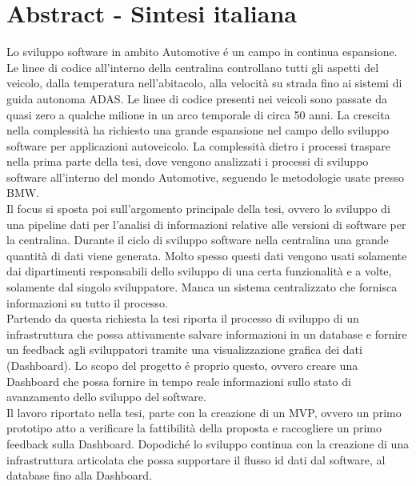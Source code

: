 \documentclass[../main.tex]{subfiles}
\begin{document}
\section{Abstract - Sintesi italiana}
Lo sviluppo software in ambito Automotive é un campo in continua espansione. Le linee di codice all'interno della centralina controllano tutti gli aspetti del veicolo, dalla temperatura nell'abitacolo, alla velocità su strada fino ai sistemi di guida autonoma ADAS. 
Le linee di codice presenti nei veicoli sono passate da quasi zero a qualche milione in un arco temporale di circa 50 anni. La crescita nella complessità ha richiesto una grande espansione nel campo dello sviluppo software per applicazioni autoveicolo. La complessità dietro i processi traspare nella prima parte della tesi, dove vengono analizzati i processi di sviluppo software all'interno del mondo Automotive, seguendo le metodologie usate presso \gls{BMW}.\\
Il focus si sposta poi sull'argomento principale della tesi, ovvero lo sviluppo di una pipeline dati per l'analisi di informazioni relative alle versioni di software per la centralina. Durante il ciclo di sviluppo software nella centralina una grande quantità di dati viene generata. Molto spesso questi dati vengono usati solamente dai dipartimenti responsabili dello sviluppo di una certa funzionalità e a volte, solamente dal singolo sviluppatore. Manca un sistema centralizzato che fornisca informazioni su tutto il processo.\\
Partendo da questa richiesta la tesi riporta il processo di sviluppo di un infrastruttura che possa attivamente salvare informazioni in un database e fornire un feedback agli sviluppatori tramite una visualizzazione grafica dei dati (Dashboard). Lo scopo del progetto é proprio questo, ovvero creare una Dashboard che possa fornire in tempo reale informazioni sullo stato di avanzamento dello sviluppo del software.\\
Il lavoro riportato nella tesi, parte con la creazione di un MVP, ovvero un primo prototipo atto a verificare la fattibilità della proposta e raccogliere un primo feedback sulla Dashboard. Dopodiché lo sviluppo continua con la creazione di una infrastruttura articolata che possa supportare il flusso id dati dal software, al database fino alla Dashboard. 
\end{document}
